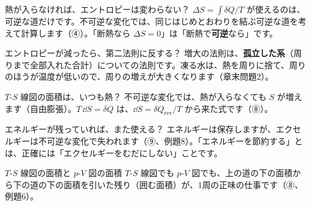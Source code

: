 \begin{tsumazuki}{熱が入らなければ、エントロピーは変わらない？}
$\Delta S=\int\delta Q/T$ が使えるのは、可逆な道だけです。不可逆な変化では、同じはじめとおわりを結ぶ可逆な道を考えて計算します（④）。「断熱なら $\Delta S=0$」は「断熱で\textbf{可逆}なら」です。
\end{tsumazuki}

\begin{tsumazuki}{エントロピーが減ったら、第二法則に反する？}
増大の法則は、\textbf{孤立した系}（周りまで全部入れた合計）についての法則です。凍る水は、熱を周りに捨て、周りのほうが温度が低いので、周りの増えが大きくなります（章末問題2）。
\end{tsumazuki}

\begin{tsumazuki}{$T$-$S$ 線図の面積は、いつも熱？}
不可逆な変化では、熱が入らなくても $S$ が増えます（自由膨張）。$T\,\dd S=\delta Q$ は、$\dd S=\delta Q_{\mathrm{rev}}/T$ から来た式です（⑧）。
\end{tsumazuki}

\begin{tsumazuki}{エネルギーが残っていれば、また使える？}
エネルギーは保存しますが、エクセルギーは不可逆な変化で失われます（⑨、例題8）。「エネルギーを節約する」とは、正確には「エクセルギーをむだにしない」ことです。
\end{tsumazuki}

\begin{tsumazuki}{$T$-$S$ 線図の面積と $p$-$V$ 図の面積}
$T$-$S$ 線図でも $p$-$V$ 図でも、上の道の下の面積から下の道の下の面積を引いた残り（囲む面積）が、1周の正味の仕事です（⑧、例題6）。
\end{tsumazuki}

